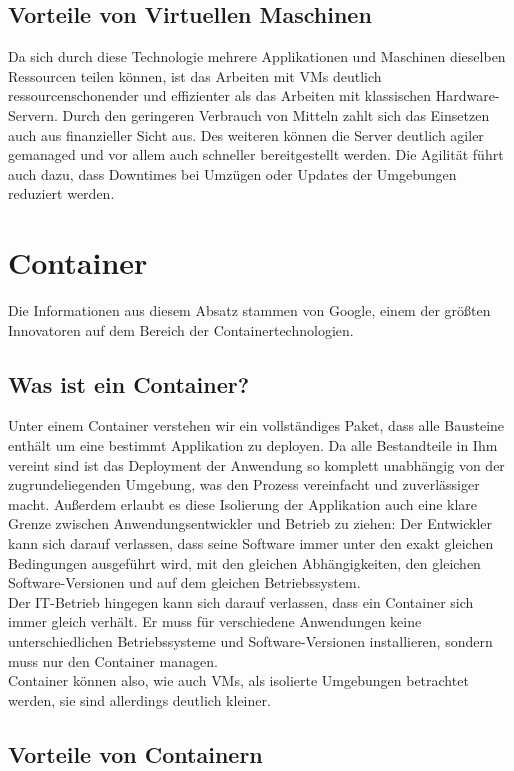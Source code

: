 \subsection{Vorteile von Virtuellen Maschinen}
Da sich durch diese Technologie mehrere Applikationen und Maschinen dieselben Ressourcen teilen können, ist das Arbeiten mit \ac{VM}s deutlich ressourcenschonender und effizienter als das Arbeiten mit klassischen Hardware-Servern.
Durch den geringeren Verbrauch von Mitteln zahlt sich das Einsetzen auch aus finanzieller Sicht aus.
Des weiteren können die Server deutlich agiler gemanaged und vor allem auch schneller bereitgestellt werden.
Die Agilität führt auch dazu, dass Downtimes bei Umzügen oder Updates der Umgebungen reduziert werden.



\section{Container}
Die Informationen aus diesem Absatz stammen von Google\cite{containers}, einem der größten Innovatoren auf dem Bereich der Containertechnologien.
\subsection{Was ist ein Container?}
Unter einem Container verstehen wir ein vollständiges Paket, dass alle Bausteine enthält um eine bestimmt Applikation zu deployen.
Da alle Bestandteile in Ihm vereint sind ist das Deployment der Anwendung so komplett unabhängig von der zugrundeliegenden Umgebung, was den Prozess vereinfacht und zuverlässiger macht.
Außerdem erlaubt es diese Isolierung der Applikation auch eine klare Grenze zwischen Anwendungsentwickler und Betrieb zu ziehen:
Der Entwickler kann sich darauf verlassen, dass seine Software immer unter den exakt gleichen Bedingungen ausgeführt wird, mit den gleichen Abhängigkeiten, den gleichen Software-Versionen und auf dem gleichen Betriebssystem.
\\
Der IT-Betrieb hingegen kann sich darauf verlassen, dass ein Container sich immer gleich verhält. 
Er muss für verschiedene Anwendungen keine unterschiedlichen Betriebssysteme und Software-Versionen installieren, sondern muss nur den Container managen.
\\
Container können also, wie auch \ac{VM}s, als isolierte Umgebungen betrachtet werden, sie sind allerdings deutlich kleiner.

\subsection{Vorteile von Containern}

